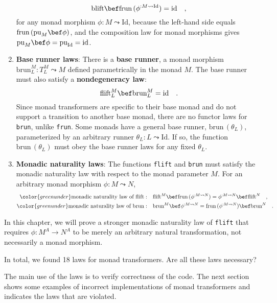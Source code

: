 \begin{enumerate}
\[
\text{blift}\bef\text{frun}\,(\phi^{:M\leadsto\text{Id}})=\text{id}\quad,
\]
for any monad morphism $\phi:M\leadsto\text{Id}$, because the left-hand
side equals $\text{frun}\,(\text{pu}_{M}\bef\phi)$, and the composition
law for monad morphisms gives $\text{pu}_{M}\bef\phi=\text{pu}_{\text{Id}}=\text{id}$.
\item \textbf{Base runner laws}:
There is a \textbf{base runner}, a monad morphism $\text{brun}_{L}^{M}:T_{L}^{M}\leadsto M$
defined parametrically in the monad $M$. The base runner must also
satisfy a \textbf{nondegeneracy law}:
\[
\text{flift}_{L}^{M}\bef\text{brun}_{L}^{M}=\text{id}\quad.
\]
Since monad transformers are specific to their base monad and do not
support a transition to another base monad, there are no functor laws
for \lstinline!brun!, unlike \lstinline!frun!. Some monads have
a general base runner, $\text{brun}\,(\theta_{L})$, parameterized
by an arbitrary runner $\theta_{L}:L\leadsto\text{Id}$. If so, the
function $\text{brun}\,(\theta_{L})$ must obey the base runner laws
for any fixed $\theta_{L}$.
\item \textbf{Monadic naturality laws}: 
The functions \lstinline!flift! and \lstinline!brun! must satisfy
the monadic naturality law with respect to the monad parameter $M$.
For an arbitrary monad morphism $\phi:M\leadsto N$,
\begin{align*}
{\color{greenunder}\text{monadic naturality law of }\text{flift}:}\quad & \text{flift}^{M}\bef\text{frun}\,(\phi^{:M\leadsto N})=\phi^{:M\leadsto N}\bef\text{flift}^{N}\quad,\\
{\color{greenunder}\text{monadic naturality law of }\text{brun}:}\quad & \text{brun}^{M}\bef\phi^{:M\leadsto N}=\text{frun}\,(\phi^{:M\leadsto N})\bef\text{brun}^{N}\quad.
\end{align*}
\end{enumerate}
In this chapter, we will prove a stronger monadic naturality law of
\lstinline!flift! that requires $\phi:M^{A}\rightarrow N^{A}$ to
be merely an arbitrary natural transformation, not necessarily a monad
morphism.

In total, we found 18 laws for monad transformers. Are all these laws
necessary? 

The main use of the laws is to verify correctness of the code. The
next section shows some examples of incorrect implementations of monad
transformers and indicates the laws that are violated.

